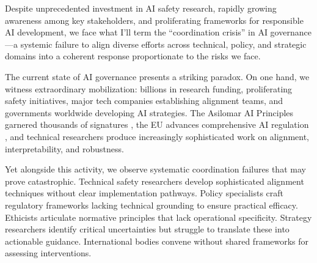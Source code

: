 \documentclass[
  11pt,
  letterpaper,
  openany]{book}
\begin{document}
Despite unprecedented investment in AI safety research, rapidly growing
awareness among key stakeholders, and proliferating frameworks for
responsible AI development, we face what I'll term the ``coordination
crisis'' in AI governance---a systemic failure to align diverse efforts
across technical, policy, and strategic domains into a coherent response
proportionate to the risks we face.

The current state of AI governance presents a striking paradox. On one
hand, we witness extraordinary mobilization: billions in research
funding, proliferating safety initiatives, major tech companies
establishing alignment teams, and governments worldwide developing AI
strategies. The Asilomar AI Principles garnered thousands of signatures
\textcite{tegmark2024}, the EU advances comprehensive AI regulation
\textcite{european2024}, and technical researchers produce increasingly
sophisticated work on alignment, interpretability, and robustness.

Yet alongside this activity, we observe systematic coordination failures
that may prove catastrophic. Technical safety researchers develop
sophisticated alignment techniques without clear implementation
pathways. Policy specialists craft regulatory frameworks lacking
technical grounding to ensure practical efficacy. Ethicists articulate
normative principles that lack operational specificity. Strategy
researchers identify critical uncertainties but struggle to translate
these into actionable guidance. International bodies convene without
shared frameworks for assessing interventions.
\end{document}
